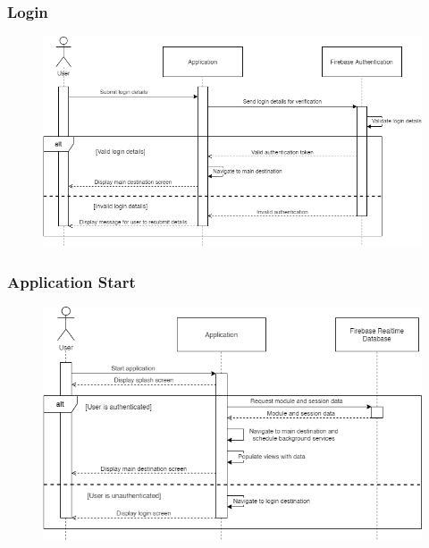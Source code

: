 \documentclass[../report.tex]{subfiles}
\begin{document}
\subsubsection{Login}
\begin{figure}[H]
\centering
\includegraphics[width=.9\textwidth]{./images/05/07-app-login.png}
\label{fig:app-login-seq}
\end{figure}

\subsubsection{Application Start}
\begin{figure}[H]
\centering
\includegraphics[width=.9\textwidth]{./images/05/07-app-start.png}
\label{fig:app-start-seq}
\end{figure}
\end{document}
